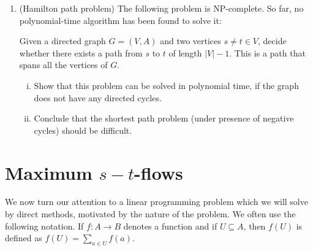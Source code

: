 \begin{enumerate}
For \(k=0\), no internal vertices are allowed. Therefore
\[
D^{(0)}_{ij}
=
\begin{cases}
0, & i=j,\\
c_{ij}, & ij\in E,\\
+\infty, & \text{otherwise.}
\end{cases}
\]

\begin{enumerate}[i)] 
\item
 Suppose that $G$ does not contain a negative weight cycle. 
  Show the recurrence
  \[
    D^{(k)}_{ij}
    =
    \min\left\{
      D^{(k-1)}_{ij},
      D^{(k-1)}_{ik}+D^{(k-1)}_{kj}
    \right\}.
  \]
\item Prove that the matrix $D^{(n)}$ can be computed in time $O(n^3)$ steps.
\item  Show that $G$ contains a negative cycle if and only if there exists an $i ∈V$ such that $D^{(n)}_{ii} <0$. 
\end{enumerate}
\item \label{hamilton} (Hamilton path problem) The following problem is NP-complete. So far, no polynomial-time algorithm has been found to solve it:

  Given a directed graph $G = (V,A)$ and two vertices $s≠t ∈ V$, decide whether there exists a path from $s$ to $t$ of length $|V|-1$. This is a path that spans all the vertices of $G$.

  \begin{enumerate}[i)] 
  \item  Show that this problem can be solved in polynomial time, if the graph does not have any directed cycles.
  \item Conclude that the shortest path problem (under presence of negative  cycles) should be difficult. 
  \end{enumerate}

  
\end{enumerate}

\section{Maximum $s-t$-flows}
\label{sec:maximum-s-t}

We now turn our attention to a linear programming problem which we
will solve by direct methods, motivated by the nature of the 
problem. We often use the following notation. If $f:A\longrightarrow B$ denotes a
function and if $U\subseteq A$, then $f(U)$ is defined as $f(U)= \sum_{a\in U}
f(a)$.  




